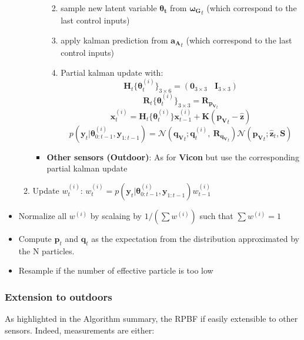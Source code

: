 \documentclass[12pt,]{article}
\providecommand{\tightlist}{%
  \setlength{\itemsep}{0pt}\setlength{\parskip}{0pt}}
\begin{document}
\begin{itemize}
\begin{enumerate}
\begin{itemize}
      \begin{enumerate}
      \def\labelenumii{\arabic{enumii}.}
      \tightlist
      \item
        sample new latent variable \(\boldsymbol{\theta_t}\) from
        \(\boldsymbol{\mathbf{\omega_G}}_t\) (which correspond to the
        last control inputs)
      \item
        apply kalman prediction from \(\mathbf{a_A}_t\) (which
        correspond to the last control inputs)
      \item
        Partial kalman update with:
        \[\mathbf{H}_t\{\boldsymbol{\theta}^{(i)}_t\}_{3 \times 6} = (\mathbf{0}_{3 \times 3} ~~~~ \mathbf{I}_{3 \times 3} )\]
        \[\mathbf{R}_t\{\boldsymbol{\theta}^{(i)}_t\}_{3 \times 3} =  \mathbf{R}_{\mathbf{p_V}_t }\]
        \[\mathbf{x}^{(i)}_t = \mathbf{H}_t\{\boldsymbol{\theta}^{(i)}_t\} \mathbf{x}^{(i)}_{t-1} + \mathbf{K}(\mathbf{p_V}_t - \hat{\mathbf{z}})\]
        \[p(\mathbf{y}_t | \boldsymbol{\theta}^{(i)}_{0:t-1}, \mathbf{y}_{1:t-1}) = \mathcal{N}(\mathbf{q_V}_t; \mathbf{q}^{(i)}_t,~ \mathbf{R}_{\mathbf{q_V}_t } )\mathcal{N}(\mathbf{p_V}_t; \hat{\mathbf{z}}_t, \mathbf{S})\]
      \end{enumerate}
    \item
      \textbf{Other sensors (Outdoor)}: As for \textbf{Vicon} but use
      the corresponding partial kalman update
    \end{itemize}
  \item
    Update \(w^{(i)}_t\):
    \(w^{(i)}_t = p(\mathbf{y}_t | \boldsymbol{\theta}^{(i)}_{0:t-1}, \mathbf{y}_{1:t-1}) w^{(i)}_{t-1}\)\\
  \end{enumerate}
\item
  Normalize all \(w^{(i)}\) by scalaing by \(1/(\sum w^{(i)})\) such
  that \(\sum w^{(i)}= 1\)
\item
  Compute \(\mathbf{p}_t\) and \(\mathbf{q}_t\) as the expectation from
  the distribution approximated by the N particles.
\item
  Resample if the number of effective particle is too low
\end{itemize}

\subsubsection{Extension to outdoors}\label{extension-to-outdoors}

As highlighted in the Algorithm summary, the RPBF if easily extensible
to other sensors. Indeed, measurements are either:
\end{document}
